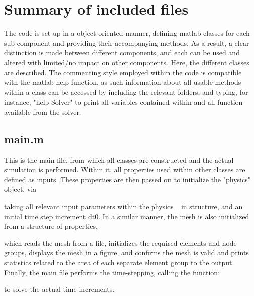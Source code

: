\documentclass[3p]{elsarticle} %
\begin{document}
\section{Summary of included files}
The code is set up in a object-oriented manner, defining matlab classes for each sub-component and providing their accompanying methods. As a result, a clear distinction is made between different components, and each can be used and altered with limited/no impact on other components. Here, the different classes are described. The commenting style employed within the code is compatible with the matlab help function, as such information about all usable methods within a class can be accessed by including the relevant folders, and typing, for instance, "help Solver" to print all variables contained within and all function available from the solver. 

\subsection{main.m}
This is the main file, from which all classes are constructed and the actual simulation is performed. Within it, all properties used within other classes are defined as inputs. These properties are then passed on to initialize the "physics" object, via 

taking all relevant input parameters within the physics\_ in structure, and an initial time step increment dt0. In a similar manner, the mesh is also initialized from a structure of properties, 

which reads the mesh from a file, initializes the required elements and node groups, displays the mesh in  a figure, and confirms the mesh is valid and prints statistics related to the area of each separate element group to the output. Finally, the main file performs the time-stepping, calling the function:

to solve the actual time increments. 
\end{document}
